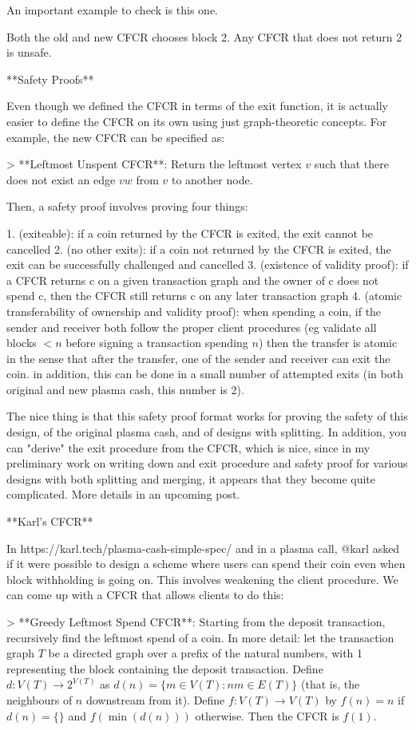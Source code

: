\documentclass{article}
\begin{document}
An important example to check is this one.

Both the old and new CFCR chooses block 2. Any CFCR that does not return 2 is unsafe.

**Safety Proofs**

Even though we defined the CFCR in terms of the exit function, it is actually easier to define the CFCR on its own using just graph-theoretic concepts. For example, the new CFCR can be specified as:

> **Leftmost Unspent CFCR**: Return the leftmost vertex $v$ such that there does not exist an edge $vw$ from $v$ to another node.

Then, a safety proof involves proving four things:

1. (exiteable): if a coin returned by the CFCR is exited, the exit cannot be cancelled
2. (no other exits): if a coin not returned by the CFCR is exited, the exit can be successfully challenged and cancelled
3. (existence of validity proof): if a CFCR returns c on a given transaction graph and the owner of c does not spend c, then the CFCR still returns c on any later transaction graph
4. (atomic transferability of ownership and validity proof): when spending a coin, if the sender and receiver both follow the proper client procedures (eg validate all blocks $< n$ before signing a transaction spending $n$) then the transfer is atomic in the sense that after the transfer, one of the sender and receiver can exit the coin. in addition, this can be done in a small number of attempted exits (in both original and new plasma cash, this number is 2).

The nice thing is that this safety proof format works for proving the safety of this design, of the original plasma cash, and of designs with splitting. In addition, you can "derive" the exit procedure from the CFCR, which is nice, since in my preliminary work on writing down and exit procedure and safety proof for various designs with both splitting and merging, it appears that they become quite complicated. More details in an upcoming post.

**Karl's CFCR**

In https://karl.tech/plasma-cash-simple-spec/ and in a plasma call, @karl asked if it were possible to design a scheme where users can spend their coin even when block withholding is going on. This involves weakening the client procedure. We can come up with a CFCR that allows clients to do this:

> **Greedy Leftmost Spend CFCR**: Starting from the deposit transaction, recursively find the leftmost spend of a coin. In more detail: let the transaction graph $T$ be a directed graph over a prefix of the natural numbers, with 1 representing the block containing the deposit transaction. Define $d: V(T) \to 2^{V(T)}$ as $d(n) = \{m \in V(T) : nm \in E(T) \}$ (that is, the neighbours of $n$ downstream from it). Define $f: V(T) \to V(T)$ by $f(n) = n$ if $d(n) = \{\}$ and $f(\min(d(n)))$ otherwise. Then the CFCR is $f(1)$.
\end{document}
